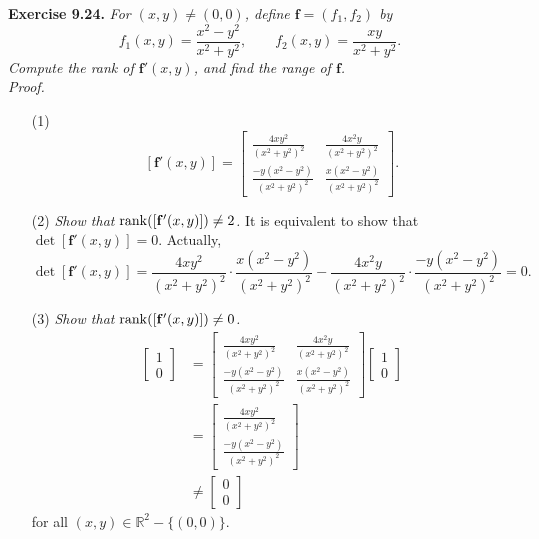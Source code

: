 \documentclass{article}
\begin{document}



\textbf{Exercise 9.24.}
\emph{For $(x,y) \neq (0,0)$, define $\mathbf{f} = (f_1,f_2)$ by
\[
  f_1(x,y) = \frac{x^2-y^2}{x^2+y^2},
  \qquad
  f_2(x,y) = \frac{xy}{x^2+y^2}.
\]
Compute the rank of $\mathbf{f}'(x,y)$, and find the range of $\mathbf{f}$.} \\

\emph{Proof.}
\begin{enumerate}
\item[(1)]
  \[
    [\mathbf{f}'(x,y)]
    =
    \begin{bmatrix}
      \frac{4xy^2}{(x^2+y^2)^2} & \frac{4x^2y}{(x^2+y^2)^2} \\
      \frac{-y(x^2-y^2)}{(x^2+y^2)^2} & \frac{x(x^2-y^2)}{(x^2+y^2)^2}
    \end{bmatrix}.
  \]

\item[(2)]
  \emph{Show that $\rank([\mathbf{f}'(x,y)]) \neq 2$.}
  It is equivalent to show that $\det[\mathbf{f}'(x,y)] = 0$.
  Actually,
  \[
    \det[\mathbf{f}'(x,y)]
    = \frac{4xy^2}{(x^2+y^2)^2} \cdot \frac{x(x^2-y^2)}{(x^2+y^2)^2}
      - \frac{4x^2y}{(x^2+y^2)^2} \cdot \frac{-y(x^2-y^2)}{(x^2+y^2)^2}
    = 0.
  \]

\item[(3)]
  \emph{Show that $\rank([\mathbf{f}'(x,y)]) \neq 0$.}
  \begin{align*}
    [\mathbf{f}'(x,y)]
    \begin{bmatrix}
      1 \\
      0
    \end{bmatrix}
    &=
    \begin{bmatrix}
      \frac{4xy^2}{(x^2+y^2)^2} & \frac{4x^2y}{(x^2+y^2)^2} \\
      \frac{-y(x^2-y^2)}{(x^2+y^2)^2} & \frac{x(x^2-y^2)}{(x^2+y^2)^2}
    \end{bmatrix}
    \begin{bmatrix}
      1 \\
      0
    \end{bmatrix} \\
    &=
    \begin{bmatrix}
      \frac{4xy^2}{(x^2+y^2)^2} \\
      \frac{-y(x^2-y^2)}{(x^2+y^2)^2}
    \end{bmatrix} \\
    &\neq
    \begin{bmatrix}
      0 \\
      0
    \end{bmatrix}
  \end{align*}
  for all $(x,y) \in \mathbb{R}^2 - \{(0,0)\}$.


\end{enumerate}
\end{document}
